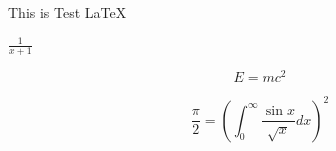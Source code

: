 \documentclass{jsarticle}
\begin{document}
This is Test LaTeX

\begin{math}
\frac{1}{x+1}
\end{math}

\begin{equation}
 E = mc^2
\end{equation}

\begin{equation}
   \frac{\pi}{2} = 
   \left( \int_{0}^{\infty} \frac{\sin x}{\sqrt{x}} dx \right)^2
\end{equation}
\end{document}
